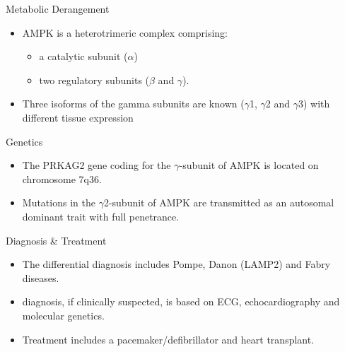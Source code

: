 \documentclass[presentation, smaller]{beamer}
\begin{document}
\begin{frame}[label={sec:orga6776b6}]{Metabolic Derangement}
\begin{itemize}
\item AMPK is a heterotrimeric complex comprising:
\begin{itemize}
\item a catalytic subunit (\(\alpha\))
\item two regulatory subunits (\(\beta\) and \(\gamma\)).
\end{itemize}
\item Three isoforms of the gamma subunits are known (\(\gamma\)1, \(\gamma\)2 and \(\gamma\)3) with different tissue
expression
\end{itemize}
\end{frame}

\begin{frame}[label={sec:orgdf52250}]{Genetics}
\begin{itemize}
\item The PRKAG2 gene coding for the \(\gamma\)-subunit of AMPK is located on chromosome 7q36.
\item Mutations in the \(\gamma\)2-subunit of AMPK are transmitted as an
autosomal dominant trait with full penetrance.
\end{itemize}
\end{frame}

\begin{frame}[label={sec:orge6cb58c}]{Diagnosis \& Treatment}
\begin{itemize}
\item The differential diagnosis includes Pompe, Danon (LAMP2) and Fabry diseases.

\item diagnosis, if clinically suspected, is based on ECG,
echocardiography and molecular genetics.

\item Treatment includes a pacemaker/defibrillator and heart transplant.
\end{itemize}
\end{frame}
\end{document}
